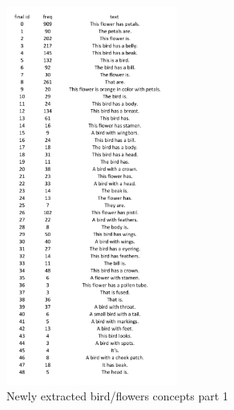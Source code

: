 \begin{figure}[h]
\centering
\caption{Newly extracted bird/flowers concepts part 1}
\includegraphics[width=0.5\textwidth]{appendix/birds_new1.png}
\end{figure}
